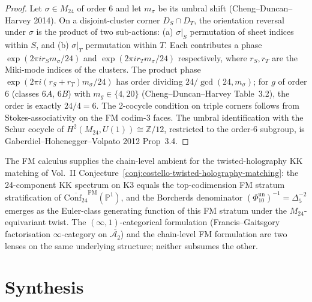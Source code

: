 \begin{proof}
Let $\sigma\in M_{24}$ of order 6 and let $m_\sigma$ be its
umbral shift (Cheng--Duncan--Harvey 2014). On a disjoint-cluster
corner $D_S\cap D_T$, the orientation reversal under
$\sigma$ is the product of two sub-actions: (a)
$\sigma|_S$ permutation of sheet indices within $S$, and (b)
$\sigma|_T$ permutation within $T$. Each contributes a phase
$\exp(2\pi i r_S m_\sigma/24)$ and $\exp(2\pi i r_T m_\sigma/24)$
respectively, where $r_S,r_T$ are the Miki-mode indices of the
clusters. The product phase
$\exp(2\pi i (r_S+r_T) m_\sigma/24)$ has order dividing
$24/\gcd(24, m_\sigma)$; for $g$ of order 6 (classes $6A$, $6B$)
with $m_g \in \{4,20\}$ (Cheng--Duncan--Harvey Table~3.2), the
order is exactly $24/4 = 6$. The 2-cocycle condition on
triple corners follows from Stokes-associativity on the FM
codim-3 faces. The umbral identification with the Schur cocycle
of $H^2(M_{24}, U(1)) \cong \mathbb Z/12$, restricted to the
order-6 subgroup, is Gaberdiel--Hohenegger--Volpato 2012
Prop~3.4.
\end{proof}

\begin{remark}
\label{rem:fm-chain-level-twisted-holography}
The FM calculus supplies the chain-level ambient for the
twisted-holography KK matching of Vol.~II
Conjecture~\ref{conj:costello-twisted-holography-matching}:
the 24-component KK spectrum on K3 equals the top-codimension
FM stratum stratification of $\overline{\mathrm{Conf}_{24}}^{\mathrm{FM}}(\mathbb{P}^1)$,
and the Borcherds denominator $(\Phi_{10}^{\mathrm{un}})^{-1} = \Delta_5^{-2}$
emerges as the Euler-class generating function of this FM
stratum under the $M_{24}$-equivariant twist. The
$(\infty,1)$-categorical formulation (Francis--Gaitsgory
factorisation $\infty$-category on
$\overline{\mathcal A_2}$) and the chain-level FM formulation
are two lenses on the same underlying structure; neither
subsumes the other.
\end{remark}

\section{Synthesis}
\label{sec:fmc-supplement}

